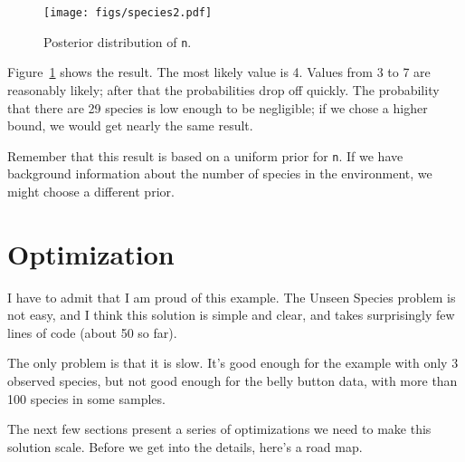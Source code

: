 \documentclass[12pt]{book}
\theoremstyle{exercise}
\newcommand{\py}[1]{{\tt #1}}%
\begin{document}
\begin{figure}
\centerline{\texttt{[image: figs/species2.pdf]}}
\caption{Posterior distribution of \py{n}.}
\label{fig.species2}
\end{figure}

Figure~\ref{fig.species2} shows the result.  The most likely value is 4.
Values from 3 to 7 are reasonably likely; after that the probabilities
drop off quickly.  The probability that there are 29 species is
low enough to be negligible; if we chose a higher bound,
we would get nearly the same result.

Remember that this result is based on a uniform prior for \py{n}.  If
we have background information about the number of species in the
environment, we might choose a different prior.  


\section{Optimization}

I have to admit that I am proud of this example.  The Unseen Species
problem is not easy, and I think this solution is simple and clear,
and takes surprisingly few lines of code (about 50 so far).

The only problem is that it is slow.  It's good enough for the example
with only 3 observed species, but not good enough for the belly button
data, with more than 100 species in some samples.

The next few sections present a series of optimizations we need to
make this solution scale.  Before we get into the details, here's
a road map.
\end{document}
